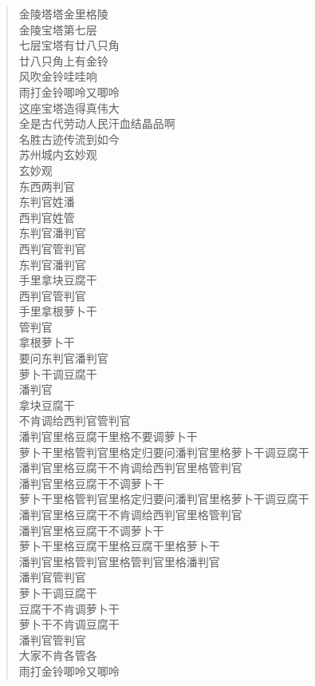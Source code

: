 \documentclass[UTF8]{ctexart}
\begin{document}
\begin{verse}
金陵塔塔金里格陵 \\
金陵宝塔第七层 \\
七层宝塔有廿八只角 \\
廿八只角上有金铃 \\
风吹金铃哇哇响 \\
雨打金铃唧呤又唧呤 \\
这座宝塔造得真伟大 \\
全是古代劳动人民汗血结晶品啊 \\
名胜古迹传流到如今 \\

苏州城内玄妙观 \\
玄妙观 \\
东西两判官 \\
东判官姓潘 \\
西判官姓管 \\
东判官潘判官 \\
西判官管判官 \\
东判官潘判官 \\
手里拿块豆腐干 \\
西判官管判官 \\
手里拿根萝卜干 \\
管判官 \\
拿根萝卜干 \\
要问东判官潘判官 \\
萝卜干调豆腐干 \\
潘判官 \\
拿块豆腐干 \\
不肯调给西判官管判官 \\
潘判官里格豆腐干里格不要调萝卜干 \\
萝卜干里格管判官里格定归要问潘判官里格萝卜干调豆腐干 \\
潘判官里格豆腐干不肯调给西判官里格管判官 \\
潘判官里格豆腐干不调萝卜干 \\
萝卜干里格管判官里格定归要问潘判官里格萝卜干调豆腐干 \\
潘判官里格豆腐干不肯调给西判官里格管判官 \\
潘判官里格豆腐干不调萝卜干 \\
萝卜干里格豆腐干里格豆腐干里格萝卜干 \\
潘判官里格管判官里格管判官里格潘判官 \\
潘判官管判官 \\
萝卜干调豆腐干 \\
豆腐干不肯调萝卜干 \\
萝卜干不肯调豆腐干 \\
潘判官管判官 \\
大家不肯各管各 \\
雨打金铃唧呤又唧呤 \\


\end{verse}
\end{document}
